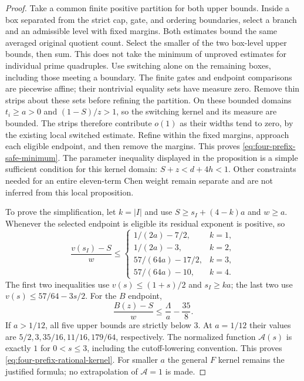 \begin{proof}
Take a common finite positive partition for both upper bounds.
Inside a box separated from the strict cap, gate, and ordering
boundaries, select a branch and an admissible level with fixed
margins.  Both estimates bound the same averaged original
quotient count.  Select the smaller of the two box-level upper
bounds, then sum.  This does not take the minimum of unproved
estimates for individual prime quadruples.
Use switching alone on the remaining boxes, including those
meeting a boundary.  The finite gates and endpoint comparisons
are piecewise affine; their nontrivial equality sets have measure
zero.  Remove thin strips about these sets before refining the
partition.  On these bounded domains $t_i\ge a>0$ and
$(1-S)/z>1$, so the switching kernel and its measure are bounded.
The strips therefore contribute $o(1)$ as their widths tend to
zero, by the existing local switched estimate.  Refine within the
fixed margins, approach each eligible endpoint, and then remove
the margins.  This proves \eqref{eq:four-prefix-safe-minimum}.
The parameter inequality displayed in the proposition is a simple
sufficient condition for this kernel domain: $S+z<d+4h<1$.
Other constraints needed for an entire eleven-term Chen weight
remain separate and are not inferred from this local proposition.

To prove the simplification, let $k=|I|$ and use
$S\ge s_I+(4-k)a$ and $w\ge a$.  Whenever the selected endpoint
is eligible its residual exponent is positive, so
\[
 \frac{v(s_I)-S}{w}\le
 \begin{cases}
  1/(2a)-7/2,&k=1,\\
  1/(2a)-3,&k=2,\\
  57/(64a)-17/2,&k=3,\\
  57/(64a)-10,&k=4.
 \end{cases}
\]
The first two inequalities use $v(s)\le(1+s)/2$ and
$s_I\ge ka$; the last two use $v(s)\le57/64-3s/2$.
For the $B$ endpoint,
\[
 \frac{B(z)-S}{w}\le\frac\Lambda a-\frac{35}{8}.
\]
If $a>1/12$, all five upper bounds are strictly below $3$.
At $a=1/12$ their values are $5/2,3,35/16,11/16,179/64$,
respectively.  The normalized function $\mathcal A(s)$ is exactly
$1$ for $0<s\le3$, including the cutoff-lowering convention.
This proves \eqref{eq:four-prefix-rational-kernel}.  For smaller
$a$ the general $F$ kernel remains the justified formula; no
extrapolation of $\mathcal A=1$ is made.
\end{proof}

